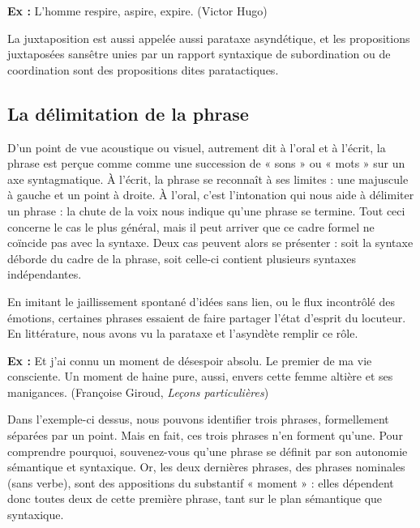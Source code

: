 \noindent\textbf{Ex :} L’homme respire, aspire, expire. (Victor Hugo)

La juxtaposition est aussi appelée aussi parataxe asyndétique, et les propositions juxtaposées sansêtre unies par un rapport syntaxique de subordination ou de coordination sont des propositions dites paratactiques.

\subsection{La délimitation de la phrase}
D’un point de vue acoustique ou visuel, autrement dit à l’oral et à l’écrit, la phrase est perçue comme comme une succession de « sons » ou « mots » sur un axe syntagmatique. À l’écrit, la phrase se reconnaît à ses limites : une majuscule à gauche et un point à droite. À l’oral, c’est l’intonation qui nous aide à délimiter un phrase : la chute de la voix nous indique qu’une phrase se termine. Tout ceci concerne le cas le plus général, mais il peut arriver que ce cadre formel ne coïncide pas avec la syntaxe. Deux cas peuvent alors se présenter : soit la syntaxe déborde du cadre de la phrase, soit celle-ci contient plusieurs syntaxes indépendantes.

En imitant le jaillissement spontané d’idées sans lien, ou le flux incontrôlé des émotions, certaines phrases essaient de faire partager l’état d’esprit du locuteur. En littérature, nous avons vu la parataxe et l’asyndète remplir ce rôle.

\noindent\textbf{Ex :} Et j’ai connu un moment de désespoir absolu. Le premier de ma vie consciente. Un moment de haine pure, aussi, envers cette femme altière et ses manigances. (Françoise Giroud, \textit{Leçons particulières})

Dans l’exemple-ci dessus, nous pouvons identifier trois phrases, formellement séparées par un point. Mais en fait, ces trois phrases n’en forment qu’une. Pour comprendre pourquoi, souvenez-vous qu’une phrase se définit par son autonomie sémantique et syntaxique. Or, les deux dernières phrases, des phrases nominales (sans verbe), sont des appositions du substantif « moment » : elles dépendent donc toutes deux de cette première phrase, tant sur le plan sémantique que syntaxique.

